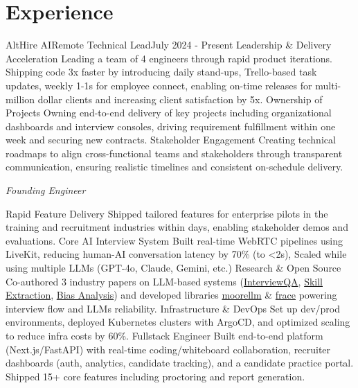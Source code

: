 \section{Experience}
\resumeSubHeadingListStart


\resumeSubheading
{AltHire AI}{Remote}
{Technical Lead}{July 2024 - Present}
\resumeItemListStart
\resumeItem
{Leadership \& Delivery Acceleration}
{Leading a team of 4 engineers through rapid product iterations. Shipping code 3x faster by introducing daily stand-ups, Trello-based task updates, weekly 1-1s for employee connect, enabling on-time releases for multi-million dollar clients and increasing client satisfaction by 5x.}
\resumeItem
{Ownership of Projects}
{Owning end-to-end delivery of key projects including organizational dashboards and interview consoles, driving requirement fulfillment within one week and securing new contracts.}
\resumeItem
{Stakeholder Engagement}
{Creating technical roadmaps to align cross-functional teams and stakeholders through transparent communication, ensuring realistic timelines and consistent on-schedule delivery.}
\resumeItemListEnd

\textit{\small Founding Engineer}
\vspace{-5pt}

\resumeItemListStart
\resumeItem
{Rapid Feature Delivery}
{Shipped tailored features for enterprise pilots in the training and recruitment industries within days, enabling stakeholder demos and evaluations.}
\resumeItem
{Core AI Interview System}
{Built real-time WebRTC pipelines using LiveKit, reducing human-AI conversation latency by 70\% (to \textless 2s), Scaled while using multiple LLMs (GPT-4o, Claude, Gemini, etc.)}
\resumeItem
{Research \& Open Source}
{Co-authored 3 industry papers on LLM-based systems (\href{https://arxiv.org/abs/2504.00310}{InterviewQA}, \href{https://arxiv.org/abs/2503.13499}{Skill Extraction}, \href{https://arxiv.org/abs/2503.07993}{Bias Analysis}) and developed libraries \href{https://github.com/searchX/moorellm}{moorellm} \& \href{https://github.com/searchX/frace}{frace} powering interview flow and LLMs reliability.}
\resumeItem
{Infrastructure \& DevOps}
{Set up dev/prod environments, deployed Kubernetes clusters with ArgoCD, and optimized scaling to reduce infra costs by 60\%.}
\resumeItem
{Fullstack Engineer}
{Built end-to-end platform (Next.js/FastAPI) with real-time coding/whiteboard collaboration, recruiter dashboards (auth, analytics, candidate tracking), and a candidate practice portal. Shipped 15+ core features including proctoring and report generation.}

